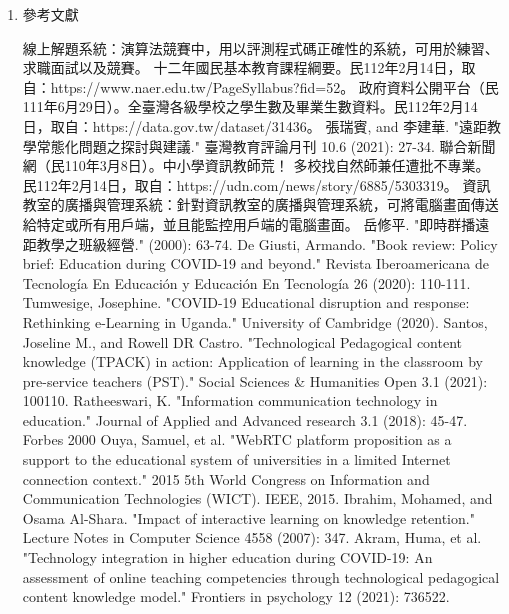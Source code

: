 \documentclass[12pt]{article}
\begin{document}
\begin{enumerate}
  \item 參考文獻
    \renewcommand{\section}[2]{}
    \begin{thebibliography}{99}  
       線上解題系統：演算法競賽中，用以評測程式碼正確性的系統，可用於練習、求職面試以及競賽。
       十二年國民基本教育課程綱要。民112年2月14日，取自：https://www.naer.edu.tw/PageSyllabus?fid=52。
       政府資料公開平台（民111年6月29日）。全臺灣各級學校之學生數及畢業生數資料。民112年2月14日，取自：https://data.gov.tw/dataset/31436。
       張瑞賓, and 李建華. "遠距教學常態化問題之探討與建議." 臺灣教育評論月刊 10.6 (2021): 27-34.
       聯合新聞網（民110年3月8日）。中小學資訊教師荒！ 多校找自然師兼任遭批不專業。民112年2月14日，取自：https://udn.com/news/story/6885/5303319。
       資訊教室的廣播與管理系統：針對資訊教室的廣播與管理系統，可將電腦畫面傳送給特定或所有用戶端，並且能監控用戶端的電腦畫面。
       岳修平. "即時群播遠距教學之班級經營." (2000): 63-74.
       De Giusti, Armando. "Book review: Policy brief: Education during COVID-19 and beyond." Revista Iberoamericana de Tecnología En Educación y Educación En Tecnología 26 (2020): 110-111.
       Tumwesige, Josephine. "COVID-19 Educational disruption and response: Rethinking e-Learning in Uganda." University of Cambridge (2020).
       Santos, Joseline M., and Rowell DR Castro. "Technological Pedagogical content knowledge (TPACK) in action: Application of learning in the classroom by pre-service teachers (PST)." Social Sciences \& Humanities Open 3.1 (2021): 100110.
       Ratheeswari, K. "Information communication technology in education." Journal of Applied and Advanced research 3.1 (2018): 45-47.
       Forbes 2000
       Ouya, Samuel, et al. "WebRTC platform proposition as a support to the educational system of universities in a limited Internet connection context." 2015 5th World Congress on Information and Communication Technologies (WICT). IEEE, 2015.
       Ibrahim, Mohamed, and Osama Al-Shara. "Impact of interactive learning on knowledge retention." Lecture Notes in Computer Science 4558 (2007): 347.
       Akram, Huma, et al. "Technology integration in higher education during COVID-19: An assessment of online teaching competencies through technological pedagogical content knowledge model." Frontiers in psychology 12 (2021): 736522.

\end{thebibliography}
\end{enumerate}
\end{document}
